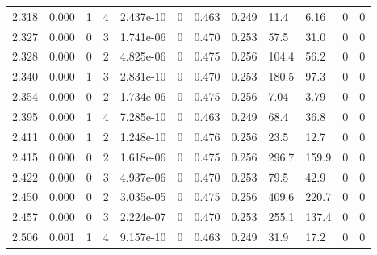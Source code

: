 \documentclass[preview]{standalone}
\begin{document}
{{{\begin{tabular}{L{1.2cm}C{1.2cm} C{0.3cm}C{0.5cm} C{1.4cm}C{1.4cm} C{1.4cm}C{1.4cm} C{1.6cm}C{1.6cm} C{1.6cm}C{1.6cm}}
  2.318  &  0.000  & 1     &  4 &  2.437e-10  & 0  &  0.463&   0.249& 11.4 & 6.16   &  0 & 0  \\ 
  2.327  &  0.000  & 0     &  3 &  1.741e-06  & 0  &  0.470&   0.253& 57.5 & 31.0   &  0 & 0  \\ 
  2.328  &  0.000  & 0     &  2 &  4.825e-06  & 0  &  0.475&   0.256& 104.4 & 56.2   &  0 & 0  \\ 
  2.340  &  0.000  & 1     &  3 &  2.831e-10  & 0  &  0.470&   0.253& 180.5 & 97.3   &  0 & 0  \\ 
  2.354  &  0.000  & 0     &  2 &  1.734e-06  & 0  &  0.475&   0.256& 7.04 & 3.79   &  0 & 0  \\ 
  2.395  &  0.000  & 1     &  4 &  7.285e-10  & 0  &  0.463&   0.249& 68.4 & 36.8   &  0 & 0  \\ 
  2.411  &  0.000  & 1     &  2 &  1.248e-10  & 0  &  0.476&   0.256& 23.5 & 12.7   &  0 & 0  \\ 
  2.415  &  0.000  & 0     &  2 &  1.618e-06  & 0  &  0.475&   0.256& 296.7 & 159.9   &  0 & 0  \\ 
  2.422  &  0.000  & 0     &  3 &  4.937e-06  & 0  &  0.470&   0.253& 79.5 & 42.9   &  0 & 0  \\ 
  2.450  &  0.000  & 0     &  2 &  3.035e-05  & 0  &  0.475&   0.256& 409.6 & 220.7   &  0 & 0  \\ 
  2.457  &  0.000  & 0     &  3 &  2.224e-07  & 0  &  0.470&   0.253& 255.1 & 137.4   &  0 & 0  \\ 
  2.506  &  0.001  & 1     &  4 &  9.157e-10  & 0  &  0.463&   0.249& 31.9 & 17.2   &  0 & 0  \\ 
\hline 
\end{tabular} 

}}}
\end{document}
